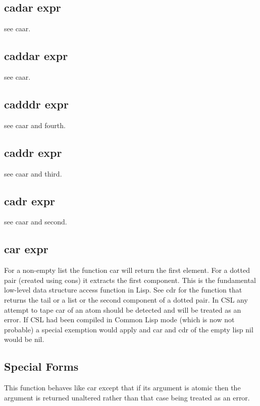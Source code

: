 \documentclass[a4paper,11pt]{article}
\begin{document}
{\subsection{\ttfamily cadar expr}
see {\ttfamily caar}.

\subsection{\ttfamily caddar expr}
see {\ttfamily caar}.

\subsection{\ttfamily cadddr expr}
see {\ttfamily caar} and {\ttfamily fourth}.

\subsection{\ttfamily caddr expr}
see {\ttfamily caar} and {\ttfamily third}.

\subsection{\ttfamily cadr expr}
see {\ttfamily caar} and {\ttfamily second}.

\subsection{\ttfamily car expr}
For a non-empty list the function {\ttfamily car} will return the
first element. For a dotted pair (created using {\ttfamily cons})
it extracts the first component. This is the fundamental low-level
data structure access function in Lisp. See {\ttfamily cdr} for the
function that returns the tail or a list or the second component of
a dotted pair. In CSL any attempt to tape {\ttfamily car} of an atom
should be detected and will be treated as an error. If CSL had been
compiled in Common Lisp mode (which is now not probable) a special
exemption would apply and {\ttfamily car} and {\ttfamily} cdr of the
empty lisp {\ttfamily nil} would be {\ttfamily nil}.

\subsection{\ttfamily Special Forms}
This function behaves like {\ttfamily car} except that if its argument
is atomic then the argument is returned unaltered rather than that case
being treated as an error.

}
\end{document}
